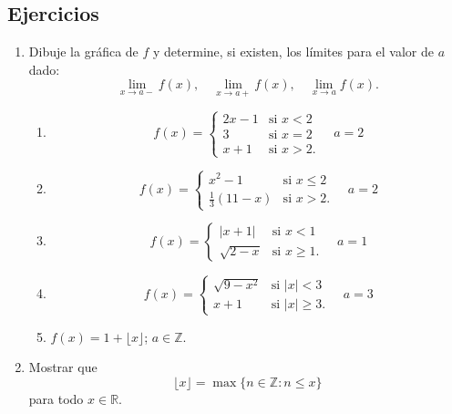 \subsection{Ejercicios}
\begingroup
\small
\begin{multicols}{2}
\begin{enumerate}[leftmargin=*]
\item Dibuje la gráfica de $f$ y determine, si existen, los límites para el valor de $a$ dado:
\begin{equation*}
	\lim_{x\to a{-}}f(x), \quad \lim_{x\to a{+}}f(x), \quad \lim_{x\to a}f(x).
\end{equation*}
\begin{enumerate}[leftmargin=*]
\item
\begin{equation*}
	f(x)=
\begin{cases}
2x-1& \text{si $x<2$}\\
3 & \text{si $x=2$}\\
x+1 & \text{si $x>2$}.
\end{cases}
\quad a=2
\end{equation*}
\item
\begin{equation*}
	f(x)=
\begin{cases}
x^2-1 & \text{si $x\leq 2$}\\
\frac{1}{3}(11-x)& \text{si $x>2$}.
\end{cases}
\quad  a=2
\end{equation*}
\item
\begin{equation*}
	f(x)=
\begin{cases}
|x+1| & \text{si $x<1$}\\
\sqrt{2-x}& \text{si $x\geq 1$}.
\end{cases}
\quad a=1
\end{equation*}
\item
\begin{equation*}
	f(x)=
\begin{cases}
\sqrt{9-x^2}& \text{si $|x|< 3$}\\
x+1 & \text{si $|x|\geq 3$}.
\end{cases}
\quad a=3
\end{equation*}
\item $f(x) =1+\lfloor x\rfloor$; $a\in \mathbb{Z}$.
\end{enumerate}

\item Mostrar que
  \[
      \lfloor x \rfloor = \max\{n\in\mathbb{Z} : n \leq x\}
  \]
  para todo $x\in\mathbb{R}$.


\end{enumerate}
\end{multicols}
